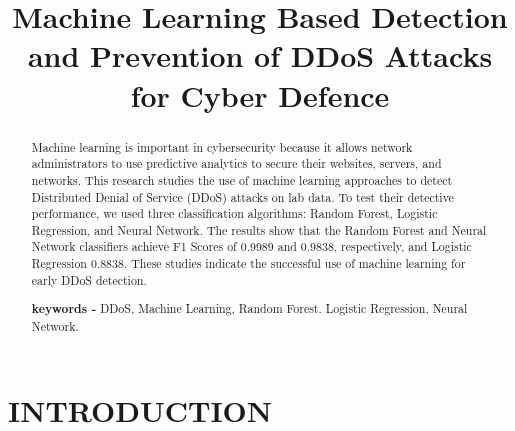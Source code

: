 \documentclass[conference]{IEEEtran}
\begin{document}
\title{Machine Learning Based Detection and Prevention of DDoS Attacks for Cyber Defence }

\author{

}
\maketitle
\IEEEpubidadjcol
\sloppy
\begin{abstract}
Machine learning is important in cybersecurity because it allows network administrators to use predictive analytics to secure their websites, servers, and networks.  This research studies the use of machine learning approaches to detect Distributed Denial of Service (DDoS) attacks on lab data.  To test their detective performance, we used three classification algorithms: Random Forest, Logistic Regression, and Neural Network.  The results show that the Random Forest and Neural Network classifiers achieve F1 Scores of 0.9989 and 0.9838, respectively, and Logistic Regression 0.8838.  These studies indicate the successful use of machine learning for early DDoS detection.


\textbf{keywords - }{DDoS, Machine Learning, Random Forest. Logistic Regression, Neural Network.}

\end{abstract}
%
%
%
\section{INTRODUCTION}
\end{document}
